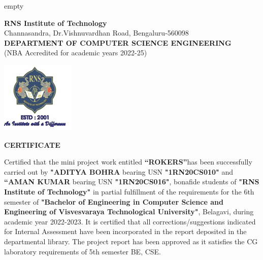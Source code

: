 
\newenvironment{certificate1}

	\clearpage\thispagestyle{empty}
	
	\begin{center}	
			\textbf{RNS Institute of Technology}\\
{\footnotesize{Channasandra, Dr.Vishnuvardhan Road, Bengaluru-560098}}\\
\textbf{DEPARTMENT OF COMPUTER SCIENCE  ENGINEERING} \\
{\footnotesize{(NBA Accredited for academic years 2022-25)}}\\
\end{center}
	
	\begin{center}
		\includegraphics[scale=0.8]{logo.png}	
	\end{center}
	\begin{center}
		\textbf{CERTIFICATE}
	\end{center}
	
Certified that the mini project work entitled \textbf{“ROKERS”}has been successfully carried out by  \textbf{"ADITYA BOHRA} bearing USN  \textbf{"1RN20CS010"} and \textbf{“AMAN KUMAR} bearing USN  \textbf{"1RN20CS016"}, bonafide students of  \textbf{"RNS Institute of Technology"} in partial fulfillment of the requirements for the 6th semester  of  \textbf{"Bachelor of Engineering in Computer Science and Engineering of Visvesvaraya Technological University"}, Belagavi, during academic year 2022-2023. It is certified that all corrections/suggestions indicated for Internal Assessment have been incorporated in the report deposited in the departmental library. The project report has been approved as it satisfies the CG laboratory requirements of 5th semester BE, CSE. 	
\\
	
